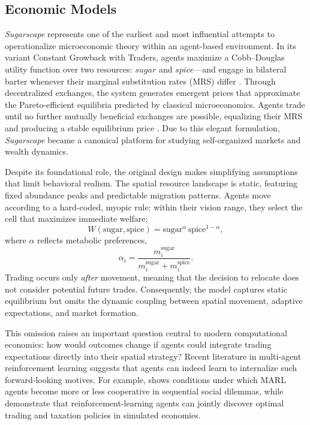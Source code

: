 \documentclass[pdflatex,sn-mathphys-num]{sn-jnl}%
\theoremstyle{thmstyleone}%
\theoremstyle{thmstyletwo}%
\theoremstyle{thmstylethree}%
\begin{document}
\subsection{Economic Models}

\textit{Sugarscape} represents one of the earliest and most influential attempts to operationalize microeconomic theory within an agent-based environment.  
In its variant Constant Growback with Traders, agents maximize a Cobb--Douglas utility function over two resources: \(sugar\) and \(spice\)---and engage in bilateral barter whenever their marginal substitution rates (MRS) differ \citep{EpsteinAxtell1996}.  
Through decentralized exchanges, the system generates emergent prices that approximate the Pareto-efficient equilibria predicted by classical microeconomics.  
Agents trade until no further mutually beneficial exchanges are possible, equalizing their MRS and producing a stable equilibrium price \citep{Axtell2005}.  
Due to this elegant formulation, \textit{Sugarscape} became a canonical platform for studying self-organized markets and wealth dynamics.

Despite its foundational role, the original design makes simplifying assumptions that limit behavioral realism.  
The spatial resource landscape is static, featuring fixed abundance peaks and predictable migration patterns.  
Agents move according to a hard-coded, myopic rule: within their vision range, they select the cell that maximizes immediate welfare;
\[
W(\text{sugar}, \text{spice}) = \text{sugar}^{\alpha}\,\text{spice}^{1-\alpha},
\]
where $\alpha$ reflects metabolic preferences,
\[
\alpha_i = \frac{m^{\text{sugar}}_i}{m^{\text{sugar}}_i + m^{\text{spice}}_i}.
\]
Trading occurs only \emph{after} movement, meaning that the decision to relocate does not consider potential future trades.  
Consequently, the model captures static equilibrium but omits the dynamic coupling between spatial movement, adaptive expectations, and market formation.

This omission raises an important question central to modern computational economics:  
how would outcomes change if agents could integrate trading expectations directly into their spatial strategy?  
Recent literature in multi-agent reinforcement learning suggests that agents can indeed learn to internalize such forward-looking motives.  
For example, \citet{Leibo2017} shows conditions under which MARL agents become more or less cooperative in sequential social dilemmas, while \citet{Zheng2022} demonstrate that reinforcement-learning agents can jointly discover optimal trading and taxation policies in simulated economies. 
\end{document}
